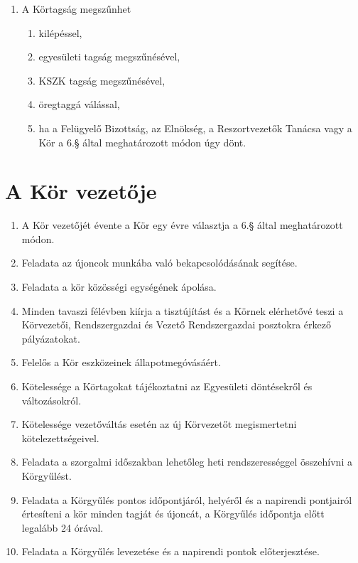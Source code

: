\documentclass[12pt]{article}
\begin{document}
\begin{enumerate}
\begin{enumerate}
\end{enumerate} %


\item A Körtagság megszűnhet

  \begin{enumerate}
    \item kilépéssel,
    \item egyesületi tagság megszűnésével,
    \item KSZK tagság megszűnésével,
    \item öregtaggá válással,
    \item ha a Felügyelő Bizottság, az Elnökség, a Reszortvezetők Tanácsa vagy a Kör a 6.§ által meghatározott módon úgy dönt.
  \end{enumerate}

\end{enumerate} %


\section{A Kör vezetője}

\begin{enumerate}
\item A Kör vezetőjét évente a Kör egy évre választja a 6.§ által meghatározott módon.
\item Feladata az újoncok munkába való bekapcsolódásának segítése.
\item Feladata a kör közösségi egységének ápolása.
\item Minden tavaszi félévben kiírja a tisztújítást és a Körnek elérhetővé teszi a Körvezetői, Rendszergazdai és Vezető Rendszergazdai posztokra érkező pályázatokat.
\item Felelős a Kör eszközeinek állapotmegóvásáért.
\item Kötelessége a Körtagokat tájékoztatni az Egyesületi döntésekről és változásokról.
\item Kötelessége vezetőváltás esetén az új Körvezetőt megismertetni kötelezettségeivel.
\item Feladata a szorgalmi időszakban lehetőleg heti rendszerességgel összehívni a Körgyűlést.
\item Feladata a Körgyűlés pontos időpontjáról, helyéről és a napirendi pontjairól értesíteni a kör minden tagját és újoncát, a Körgyűlés időpontja előtt legalább 24 órával.
\item Feladata a Körgyűlés levezetése és a napirendi pontok előterjesztése.
\end{enumerate}
\end{document}
